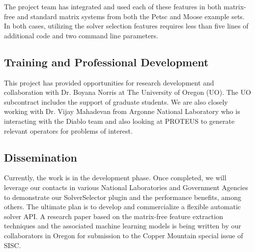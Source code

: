 The project team has integrated and used each of these features in both matrix-free and standard matrix systems from both the Petsc and Moose example sets. In both cases, utilizing the solver selection features requires less than five lines of additional code and two command line parameters. 

\subsection{Training and Professional Development}

This project has provided opportunities for research development and collaboration with Dr. Boyana Norris at The University of Oregon (UO). The UO subcontract includes the support of graduate students. We are also closely working with Dr. Vijay Mahadevan from Argonne National Laboratory who is interacting with the Diablo team and also looking at PROTEUS to generate relevant operators for problems of interest.

\subsection{Dissemination}
Currently, the work is in the development phase. Once completed, we will leverage our contacts in various National Laboratories and Government Agencies to demonstrate our SolverSelector plugin and the performance benefits, among others. The ultimate plan is to develop and commercialize a flexible automatic solver API. A research paper based on the matrix-free feature extraction techniques and the associated machine learning models is being written by our collaborators in Oregon for submission to the Copper Mountain special issue of SISC. 

